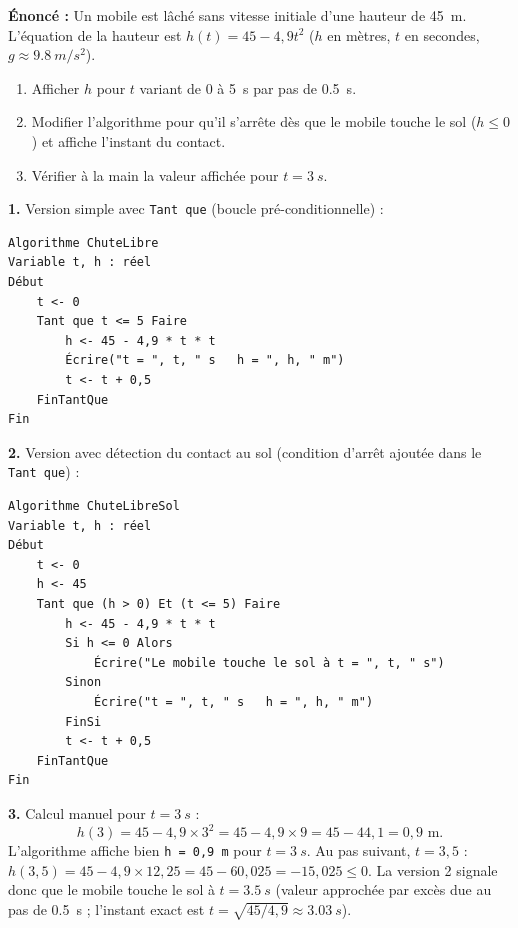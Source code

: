 \documentclass[11pt]{article}
\begin{document}
\begin{corrige}
\textbf{Énoncé :} Un mobile est lâché sans vitesse initiale d'une hauteur de \SI{45}{m}. L'équation de la hauteur est $h(t) = 45 - 4,9 t^2$ ($h$ en mètres, $t$ en secondes, $g \approx \SI{9,8}{m/s^2}$).
\begin{enumerate}
  \item Afficher $h$ pour $t$ variant de 0 à \SI{5}{s} par pas de \SI{0,5}{s}.
  \item Modifier l'algorithme pour qu'il s'arrête dès que le mobile touche le sol ($h \le 0$) et affiche l'instant du contact.
  \item Vérifier à la main la valeur affichée pour $t = \SI{3}{s}$.
\end{enumerate}
\tcblower
\textbf{1.} Version simple avec \texttt{Tant que} (boucle pré-conditionnelle) :

\begin{lstlisting}
Algorithme ChuteLibre
Variable t, h : réel
Début
    t <- 0
    Tant que t <= 5 Faire
        h <- 45 - 4,9 * t * t
        Écrire("t = ", t, " s   h = ", h, " m")
        t <- t + 0,5
    FinTantQue
Fin
\end{lstlisting}

\textbf{2.} Version avec détection du contact au sol (condition d'arrêt ajoutée dans le \texttt{Tant que}) :

\begin{lstlisting}
Algorithme ChuteLibreSol
Variable t, h : réel
Début
    t <- 0
    h <- 45
    Tant que (h > 0) Et (t <= 5) Faire
        h <- 45 - 4,9 * t * t
        Si h <= 0 Alors
            Écrire("Le mobile touche le sol à t = ", t, " s")
        Sinon
            Écrire("t = ", t, " s   h = ", h, " m")
        FinSi
        t <- t + 0,5
    FinTantQue
Fin
\end{lstlisting}

\textbf{3.} Calcul manuel pour $t = \SI{3}{s}$ :
\[ h(3) = 45 - 4{,}9 \times 3^2 = 45 - 4{,}9 \times 9 = 45 - 44{,}1 = 0{,}9 \text{ m}. \]
L'algorithme affiche bien \texttt{h = 0,9 m} pour $t = \SI{3}{s}$.
Au pas suivant, $t = 3{,}5$ : $h(3{,}5) = 45 - 4{,}9 \times 12{,}25 = 45 - 60{,}025 = -15{,}025 \leq 0$.
La version 2 signale donc que le mobile touche le sol à $t = \SI{3,5}{s}$ (valeur approchée par excès due au pas de \SI{0,5}{s} ; l'instant exact est $t = \sqrt{45/4{,}9} \approx \SI{3,03}{s}$).
\end{corrige}
\end{document}
